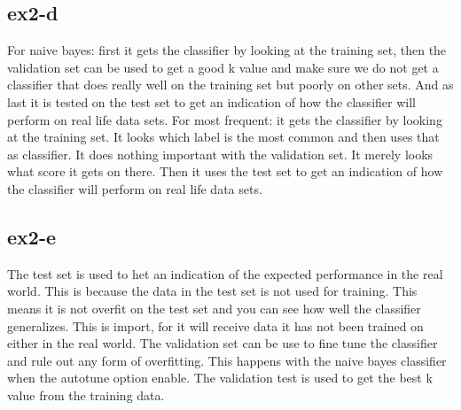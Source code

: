 \subsection{ex2-d}
For naive bayes: first it gets the classifier by looking at the training set, then the 
validation set can be used to get a good k value and make sure we do not
get a classifier that does really well on the training set but poorly on other sets.
And as last it is tested on the test set to get an indication of how the classifier will
perform on real life data sets.
For  most frequent: it gets the classifier by looking at the training set. It looks which label
is the most common and then uses that as classifier. It does nothing important with the validation set.
It merely looks what score it gets on there. Then it uses the test set to get an indication 
of how the classifier will perform on real life data sets.


\subsection{ex2-e}
The test set is used to het an indication of the expected performance in the real world. This is because the data in the test set is not used for training. This means it is not overfit on the test set and you can see how well the classifier generalizes. This is import, for it will receive data it has not been trained on either in the real world. The validation set can be use to fine tune the classifier and rule out any
form of overfitting. This happens with the naive bayes classifier when the autotune option enable. 
The validation test is used to get the best k value from the training data.
